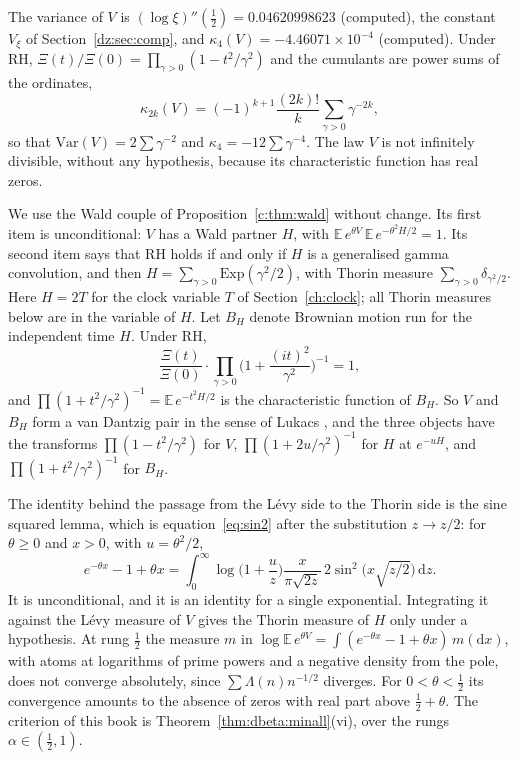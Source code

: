 The variance of $V$ is $(\log\xi)''(\frac12)=0.04620998623$ (computed), the constant $V_\xi$ of Section~\ref{dz:sec:comp}, and $\kappa_4(V)=-4.46071\times10^{-4}$ (computed). Under RH, $\Xi(t)/\Xi(0)=\prod_{\gamma>0}(1-t^2/\gamma^2)$ and the cumulants are power sums of the ordinates,
\[
\kappa_{2k}(V)=(-1)^{k+1}\frac{(2k)!}{k}\sum_{\gamma>0}\gamma^{-2k},
\]
so that $\mathrm{Var}(V)=2\sum\gamma^{-2}$ and $\kappa_4=-12\sum\gamma^{-4}$. The law $V$ is not infinitely divisible, without any hypothesis, because its characteristic function has real zeros.

We use the Wald couple of Proposition~\ref{c:thm:wald} without change. Its first item is unconditional: $V$ has a Wald partner $H$, with $\mathbb E\,e^{\theta V}\,\mathbb E\,e^{-\theta^2H/2}=1$. Its second item says that RH holds if and only if $H$ is a generalised gamma convolution, and then $H=\sum_{\gamma>0}\mathrm{Exp}(\gamma^2/2)$, with Thorin measure $\sum_{\gamma>0}\delta_{\gamma^2/2}$. Here $H=2T$ for the clock variable $T$ of Section~\ref{ch:clock}; all Thorin measures below are in the variable of $H$. Let $B_H$ denote Brownian motion run for the independent time $H$. Under RH,
\[
\frac{\Xi(t)}{\Xi(0)}\cdot\prod_{\gamma>0}\Big(1+\frac{(it)^2}{\gamma^2}\Big)^{-1}=1,
\]
and $\prod(1+t^2/\gamma^2)^{-1}=\mathbb E\,e^{-t^2H/2}$ is the characteristic function of $B_H$. So $V$ and $B_H$ form a van Dantzig pair in the sense of Lukacs \cite{Lukacs68}, and the three objects have the transforms $\prod(1-t^2/\gamma^2)$ for $V$, $\prod(1+2u/\gamma^2)^{-1}$ for $H$ at $e^{-uH}$, and $\prod(1+t^2/\gamma^2)^{-1}$ for $B_H$.

The identity behind the passage from the L\'evy side to the Thorin side is the sine squared lemma, which is equation~\eqref{eq:sin2} after the substitution $z\to z/2$: for $\theta\ge0$ and $x>0$, with $u=\theta^2/2$,
\[
e^{-\theta x}-1+\theta x=\int_0^\infty\log\Big(1+\frac uz\Big)\frac{x}{\pi\sqrt{2z}}\,2\sin^2\!\big(x\sqrt{z/2}\big)\,\mathrm dz .
\]
It is unconditional, and it is an identity for a single exponential. Integrating it against the L\'evy measure of $V$ gives the Thorin measure of $H$ only under a hypothesis. At rung $\frac12$ the measure $m$ in $\log\mathbb E\,e^{\theta V}=\int(e^{-\theta x}-1+\theta x)\,m(\mathrm dx)$, with atoms at logarithms of prime powers and a negative density from the pole, does not converge absolutely, since $\sum\Lambda(n)n^{-1/2}$ diverges. For $0<\theta<\frac12$ its convergence amounts to the absence of zeros with real part above $\frac12+\theta$. The criterion of this book is Theorem~\ref{thm:dbeta:minall}(vi), over the rungs $\alpha\in(\frac12,1)$.

